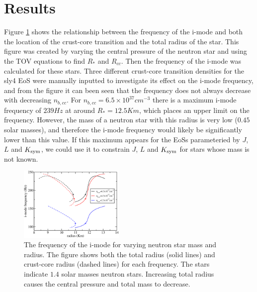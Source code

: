 \documentclass[fleqn,usenatbib]{mnras}
\begin{document}
\section{Results}
\hspace{\parindent}Figure \ref{fig:f_vs_Rcc_R*} shows the relationship between the frequency of the i-mode and both the location of the crust-core transition and the total radius of the star. This figure was created by varying the central pressure of the neutron star and using the TOV equations to find $R_*$ and $R_{cc}$. Then the frequency of the i-mode was calculated for these stars. Three different crust-core transition densities for the sly4 EoS were manually inputted to investigate its effect on the i-mode frequency, and from the figure it can been seen that the frequency does not always decrease with decreasing $n_{b,cc}$. For $n_{b,cc}=6.5\times10^{37}cm^{-3}$ there is a maximum i-mode frequency of $239 Hz$ at around $R_*=12.5 Km$, which places an upper limit on the frequency. However, the mass of a neutron star with this radius is very low ($0.45$ solar masses), and therefore the i-mode frequency would likely be significantly lower than this value. If this maximum appears for the EoSs parameteried by $J$, $L$ and $K_{\rm sym}$, we could use it to constrain $J$, $L$ and $K_{\rm sym}$ for stars whose mass is not known.

\begin{figure}
\centering
\includegraphics[width=0.45\textwidth,angle=0]{f_Rstar_Rcc_2}
\caption{The frequency of the i-mode for varying neutron star mass and radius. The figure shows both the total radius (solid lines) and crust-core radius (dashed lines) for each frequency. The stars indicate $1.4$ solar masses neutron stars. Increasing total radius causes the central pressure and total mass to decrease.}
\label{fig:f_vs_Rcc_R*}
\end{figure}
\end{document}

